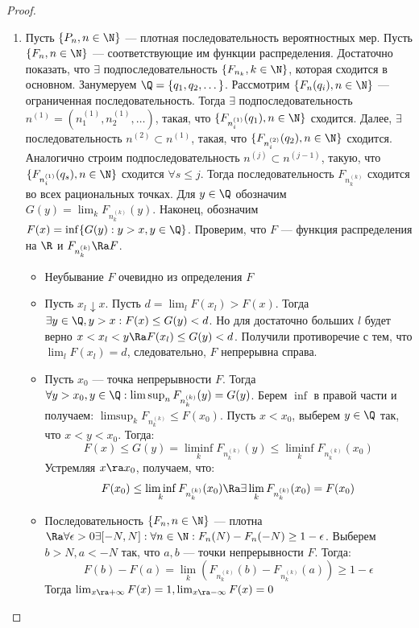 \begin{proof}
\begin{enumerate}
        \item[\(\La\)] Пусть \(\{P_n, n \in \N\}\) --- плотная последовательность вероятностных мер. Пусть \(\{F_n, n \in \N\}\) --- соответствующие им функции распределения. Достаточно показать, что \(\exists\) подпоследовательность \(\{F_{n_k}, k \in \N\}\), которая сходится в основном. Занумеруем \(\Q = \{q_1, q_2, \dots\}\). Рассмотрим \(\{F_n(q_i), n \in \N\}\) --- ограниченная последовательность. Тогда \(\exists \) подпоследовательность \(n^{(1)} = (n^{(1)}_1, n^{(1)}_2, \dots )\), такая, что \(\{F_{n^{(1)}_i}(q_1), n \in \N\}\) сходится. Далее, \(\exists \)последовательность \(n^{(2)} \subset n^{(1)}\), такая, что \(\{F_{n^{(2)}_i}(q_2), n \in \N\}\) сходится. Аналогично строим подпоследовательность \(n^{(j)} \subset n^{(j-1)}\), такую, что \(\{F_{n^{(1)}_i}(q_s), n \in \N\}\) сходится \(\forall s \le j\). Тогда последовательность \(F_{n^{(k)}_k}\) сходится во всех рациональных точках. Для \(y \in \Q\) обозначим \(G(y) = \lim_k F_{n^{(k)}_k}(y)\). Наконец, обозначим \(F(x) = \inf\{G(y): y > x, y \in \Q\}\). Проверим, что \(F\) --- функция распределения на \(\R\) и \(F_{n_k^{(k)}} \Ra F\).
        \begin{itemize}
            \item Неубывание \(F\) очевидно из определения \(F\)
            \item Пусть \(x_l \downarrow x\). Пусть \(d = \lim_{l} F(x_l) > F(x)\). Тогда \(\exists y \in \Q, y > x: F(x) \le G(y) < d\). Но для достаточно больших \(l\) будет верно \(x < x_l < y \Ra F(x_l) \le G(y) < d\). Получили противоречие с тем, что \(\lim_l F(x_l) = d\), следовательно, \(F\) непрерывна справа.
            \item Пусть \(x_0\) --- точка непрерывности \(F\). Тогда \(\forall y > x_0, y \in \Q: \limsup_n F_{n_k^{(k)}}(y) = G(y)\). Берем \(\inf\) в правой части и получаем: \(\limsup_k F_{n_k^{(k)}} \le F(x_0)\). Пусть \(x < x_0\), выберем \(y \in \Q\) так, что \(x < y < x_0\). Тогда:
            \[F(x) \le G(y) = \liminf_k F_{n_k^{(k)}}(y) \le \liminf_{k}F_{n_k^{(k)}}(x_0)\]
            Устремляя \(x \ra x_0\), получаем, что:
            \[F(x_0) \le \liminf_k F_{n_k^{(k)}}(x_0) \Ra \exists \lim_{k} F_{n_k^{(k)}}(x_0) = F(x_0)\]
            \item Последовательность \(\{F_n, n \in \N\}\) --- плотна \(\Ra \forall \epsilon > 0 \exists [-N, N]: \forall n \in \N: F_n(N) - F_n(-N) \ge 1 - \epsilon\). Выберем \(b > N, a < -N\) так, что \(a, b\) --- точки непрерывности \(F\). Тогда:
            \[F(b) - F(a) = \lim_k\left( F_{n_k^{(k)}}(b) - F_{n_k^{(k)}}(a) \right) \ge 1 - \epsilon\]
            Тогда \(\lim_{x \ra +\infty} F(x) = 1, \lim_{x \ra -\infty} F(x) = 0\)
        \end{itemize}
    \end{enumerate}
\end{proof}

